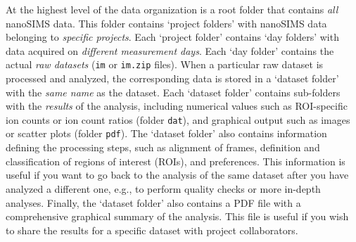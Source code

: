 \documentclass[a4paper, 11pt]{article}
\newcommand{\ttt}[1]{\texttt{#1}}
\begin{document}
At the highest level of the data organization is a root folder that contains \emph{all} nanoSIMS data. This folder contains `project folders' with nanoSIMS data belonging to \emph{specific projects}. Each `project folder' contains `day folders' with data acquired on \emph{different measurement days}. Each `day folder' contains the actual \emph{raw datasets} (\ttt{im} or \ttt{im.zip} files). When a particular raw dataset is processed and analyzed, the corresponding data is stored in a `dataset folder' with the \emph{same name} as the dataset. Each `dataset folder' contains sub-folders with the \emph{results} of the analysis, including numerical values such as ROI-specific ion counts or ion count ratios (folder \ttt{dat}), and graphical output such as images or scatter plots (folder \ttt{pdf}). The `dataset folder' also contains information defining the processing steps, such as alignment of frames, definition and classification of regions of interest (ROIs), and preferences. This information is useful if you want to go back to the analysis of the same dataset after you have analyzed a different one, e.g., to perform quality checks or more in-depth analyses. Finally, the `dataset folder' also contains a PDF file with a comprehensive graphical summary of the analysis. This file is useful if you wish to share the results for a specific dataset with project collaborators.
\end{document}
